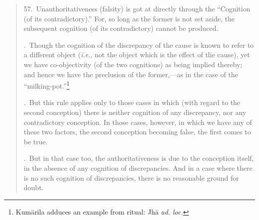 ﻿\documentclass[11pt]{amsart}
\begin{document}
\small\begin{quote}57.~Unauthoritativeness (falsity) is got at directly through the ``Cognition (of its contradictory).'' For, so long as the former is not set aside, the subsequent cognition (of its contradictory) cannot be produced.

.~Though the cognition of the discrepancy of the cause is known to refer to a different object (\emph{i.e.}, not the object which is the effect of tlie cause), yet we have co-objectivity (of the two cognitions) as being implied thereby; and hence we have the preclusion of the former,---as in the case of the ``milking-pot.''\footnote{Kum\=arila adduces an example from ritual: Jh\=a \emph{ad. loc.}}

.~But this rule applies only to those cases in which (with regard to the second conception) there is neither cognition of any discrepancy, nor any contradictory conception. In those cases, however, in which we have any of these two factors, the second conception becoming false, the first comes to be true. 

.~But in that case too, the authoritativeness is due to the conception itself, in the absence of any cognition of discrepancies. And in a case where there is no such cognition of discrepancies, there is no reasonable ground for doubt. 


\end{quote}
\end{document}
